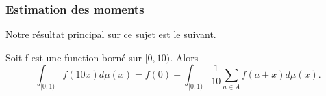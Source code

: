 	\subsubsection{Estimation des moments}
	Notre r\'esultat principal sur ce sujet est le suivant.
\begin{lem}
	Soit f est une function born\'e sur $[0, 10)$. Alors
	\[
		\int_{[0, 1)} f(10x) d\mu(x) = f(0) + \int_{[0, 1)} \frac{1}{10}
		\sum_{a\in A} f(a+x) d\mu(x).
	\]
	\label{lem:integralSum}
\end{lem}

